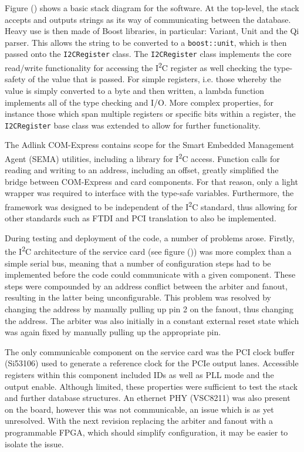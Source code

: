 \documentclass[a4paper,11pt,twocolumn]{article}
\begin{document}
	Figure () shows a basic stack diagram for the software. At the top-level, the stack accepts and outputs strings as its way of communicating between the database. Heavy use is then made of Boost libraries, in particular: Variant, Unit and the Qi parser. This allows the string to be converted to a \verb|boost::unit|, which is then passed onto the \verb|I2CRegister| class. The \verb|I2CRegister| class implements the core read/write functionality for accessing the I\textsuperscript{2}C register as well checking the type-safety of the value that is passed. For simple registers, i.e. those whereby the value is simply converted to a byte and then written, a lambda function implements all of the type checking and I/O. More complex properties, for instance those which span multiple registers or specific bits within a register, the \verb|I2CRegister| base class was extended to allow for further functionality.

	The Adlink COM-Express contains scope for the Smart Embedded Management Agent (SEMA) utilities, including a library for I\textsuperscript{2}C access. Function calls for reading and writing to an address, including an offset, greatly simplified the bridge between COM-Express and card components. For that reason, only a light wrapper was required to interface with the type-safe variables. Furthermore, the framework was designed to be independent of the I\textsuperscript{2}C standard, thus allowing for other standards such as FTDI and PCI translation to also be implemented.

	During testing and deployment of the code, a number of problems arose. Firstly, the I\textsuperscript{2}C architecture of the service card (see figure ()) was more complex than a simple serial bus, meaning that a number of configuration steps had to be implemented before the code could communicate with a given component. These steps were compounded by an address conflict between the arbiter and fanout, resulting in the latter being unconfigurable. This problem was resolved by changing the address by manually pulling up pin 2 on the fanout, thus changing the address. The arbiter was also initially in a constant external reset state which was again fixed by manually pulling up the appropriate pin.

	The only communicable component on the service card was the PCI clock buffer (Si53106) used to generate a reference clock for the PCIe output lanes. Accessible registers within this component included IDs as well as PLL mode and the output enable. Although limited, these properties were sufficient to test the stack and further database structures. An ethernet PHY (VSC8211) was also present on the board, however this was not communicable, an issue which is as yet unresolved. With the next revision replacing the arbiter and fanout with a programmable FPGA, which should simplify configuration, it may be easier to isolate the issue.
\end{document}
